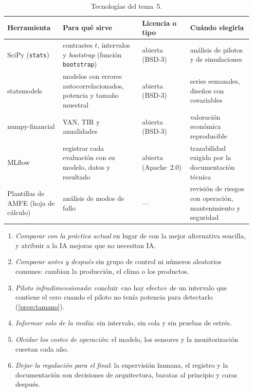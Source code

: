 \begin{table}[h]
\centering\small
\caption{Tecnologías del tema~5.}\label{tab:tec5}
\begin{tabularx}{\textwidth}{@{}>{\raggedright\arraybackslash}p{2.5cm}>{\raggedright\arraybackslash}X>{\raggedright\arraybackslash}p{2.1cm}>{\raggedright\arraybackslash}X@{}}
\toprule
Herramienta & Para qué sirve & Licencia o tipo & Cuándo elegirla \\
\midrule
SciPy (\texttt{stats}) & contrastes $t$, intervalos y \emph{bootstrap} (función \texttt{bootstrap}) & abierta (BSD-3) & análisis de pilotos y de simulaciones \\
statsmodels & modelos con errores autocorrelacionados, potencia y tamaño muestral & abierta (BSD-3) & series semanales, diseños con covariables \\
numpy-financial & VAN, TIR y anualidades & abierta (BSD-3) & valoración económica reproducible \\
MLflow~\cite{mlflow} & registrar cada evaluación con su modelo, datos y resultado & abierta (Apache~2.0) & trazabilidad exigida por la documentación técnica \\
Plantillas de AMFE (hoja de cálculo) & análisis de modos de fallo & --- & revisión de riesgos con operación, mantenimiento y seguridad \\
\bottomrule
\end{tabularx}
\end{table}

\begin{observacion}\label{obs:errores5}
\begin{enumerate}[label=(\alph*)]
  \item \emph{Comparar con la práctica actual} en lugar de con la mejor alternativa sencilla, y atribuir a la IA mejoras que no necesitan IA.
  \item \emph{Comparar antes y después} sin grupo de control ni números aleatorios comunes: cambian la producción, el clima o los productos.
  \item \emph{Piloto infradimensionado}: concluir «no hay efecto» de un intervalo que contiene el cero cuando el piloto no tenía potencia para detectarlo (\cref{prop:tamano}).
  \item \emph{Informar solo de la media}: sin intervalo, sin cola y sin pruebas de estrés.
  \item \emph{Olvidar los costes de operación}: el modelo, los sensores y la monitorización cuestan cada año.
  \item \emph{Dejar la regulación para el final}: la supervisión humana, el registro y la documentación son decisiones de arquitectura, baratas al principio y caras después.
\end{enumerate}
\end{observacion}

